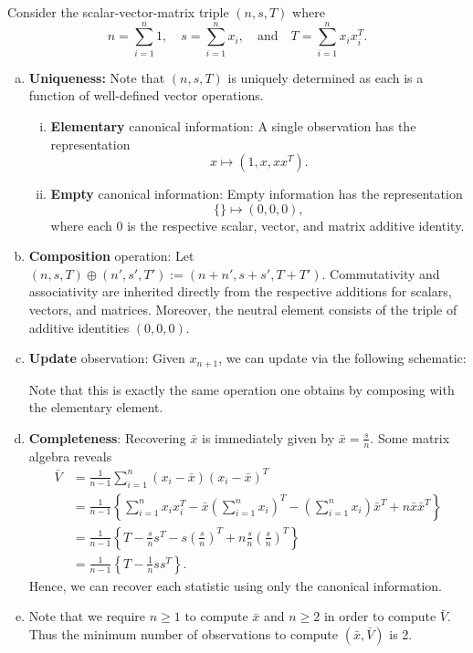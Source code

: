 \documentclass{homework}
\begin{document}
\begin{solution}
  Consider the scalar-vector-matrix triple $(n,s,T)$ where
  $$
  n = \sum_{i=1}^n 1,\quad s = \sum_{i=1}^n x_i,\quad\text{and}\quad T= \sum_{i=1}^n x_ix_i^T.
  $$
  \begin{enumerate}[(a)]
    \item \textbf{Uniqueness:} Note that $(n,s,T)$ is uniquely determined as each is a function of well-defined vector operations.
      \begin{enumerate}[(i)]
	\item \textbf{Elementary} canonical information: A single observation has the representation
	  $$
	  x \mapsto (1,x,xx^T).
	  $$
	\item \textbf{Empty} canonical information: Empty information has the representation
	  $$
	  \{\} \mapsto (0,0,0),
	  $$
	  where each $0$ is the respective scalar, vector, and matrix additive identity.
      \end{enumerate}
    \item \textbf{Composition} operation: Let $(n,s,T) \oplus (n',s',T') := (n+n', s+s', T+T')$. Commutativity and associativity are inherited directly from the respective additions for scalars, vectors, and matrices.  Moreover, the neutral element consists of the triple of additive identities $(0,0,0)$.
    \item \textbf{Update} observation: Given $x_{n+1}$, we can update via the following schematic:

      Note that this is exactly the same operation one obtains by composing with the elementary element.
    \item \textbf{Completeness}: Recovering $\bar x$ is immediately given by $ \bar x = \frac sn $. Some matrix algebra reveals
      \begin{align*}
	\bar V 
	&= \frac{1}{n-1} \sum_{i=1}^n (x_i - \bar x)(x_i - \bar x)^T \\
	&= \frac{1}{n-1}\left\{ \sum_{i=1}^n x_ix_i^T - \bar x \left(\sum_{i=1}^n x_i \right)^T - \left(\sum_{i=1}^n x_i\right) \bar x^T + n\bar x \bar x^T\right\} \\
	&= \frac{1}{n-1}\left\{T - \frac sn s^T - s \left(\frac sn\right)^T + n \frac sn \left(\frac sn\right)^T \right\} \\
	&= \frac{1}{n-1}\left\{T - \frac 1n ss^T\right\}.
      \end{align*}
      Hence, we can recover each statistic using only the canonical information.

    \item Note that we require $n \ge 1$ to compute $\bar x$ and $n\ge 2$ in order to compute $\bar V$. Thus the minimum number of observations to compute $(\bar x, \bar V)$ is 2.
  \end{enumerate}
\end{solution}
\end{document}
